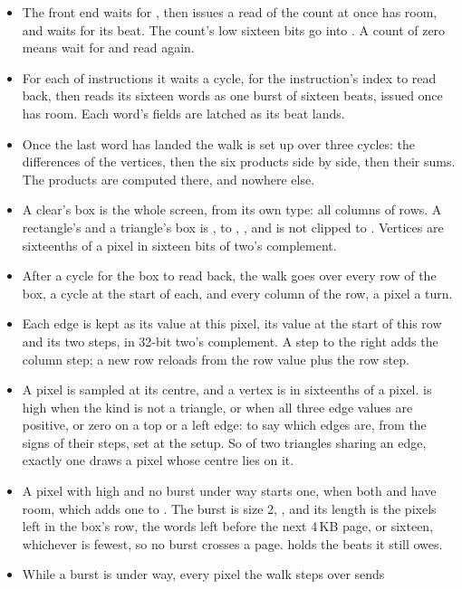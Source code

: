 \begin{itemize}
\item The front end waits for , then issues a read of the
count at  once  has room, and waits for its
beat. The count's low sixteen bits go into . A count of
zero means wait for  and read again.
\item For each of  instructions it waits a cycle, for the
instruction's index to read back, then reads its sixteen words as one
burst of sixteen beats, issued once  has room. Each
word's fields are latched as its beat lands.
\item Once the last word has landed the walk is set up over three
cycles: the differences of the vertices, then the six products side
by side, then their sums. The products are computed there, and
nowhere else.
\item A clear's box is the whole screen, from its own type: all
 columns of  rows. A rectangle's and a
triangle's box is ,  to , , and
is not clipped to . Vertices are sixteenths of a pixel in
sixteen bits of two's complement.
\item After a cycle for the box to read back, the walk goes over every
row of the box, a cycle at the start of each, and every column of the
row, a pixel a turn.
\item Each edge is kept as its value at this pixel, its value at the
start of this row and its two steps, in 32-bit two's complement. A
step to the right adds the column step; a new row reloads from the row
value plus the row step.
\item A pixel is sampled at its centre, and a vertex is in sixteenths
of a pixel.  is high when the kind is not a triangle, or when
all three edge values are positive, or zero on a top or a left edge:
 to  say which edges are, from the signs of
their steps, set at the setup. So of two triangles sharing an edge,
exactly one draws a pixel whose centre lies on it.
\item A pixel with  high and no burst under way starts one,
when both  and  have room, which adds one to
. The burst is size 2, , and its length is the
pixels left in the box's row, the words left before the next 4\,KB
page, or sixteen, whichever is fewest, so no burst crosses a page.
 holds the beats it still owes.
\item While a burst is under way, every pixel the walk steps over sends

\end{itemize}
